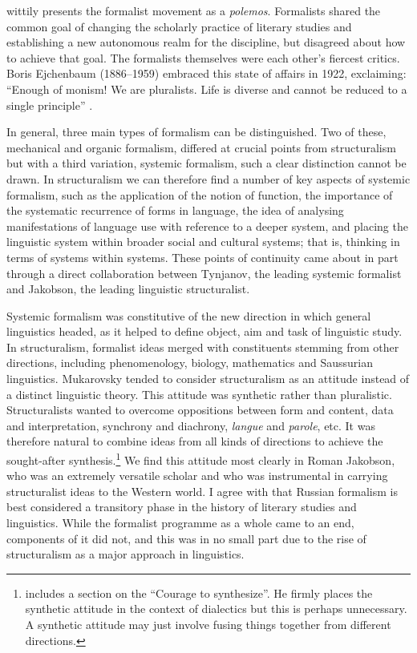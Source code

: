 \documentclass[output=paper]{langscibook}
\begin{document}
\citet{Steiner1984} wittily presents the formalist movement as a \emph{polemos}. Formalists shared the common goal of changing the scholarly practice of literary studies and establishing a new autonomous realm for the discipline, but disagreed about how to achieve that goal. The formalists themselves were each other's fiercest critics. Boris Ejchenbaum (1886--1959) embraced this state of affairs in 1922, exclaiming: ``Enough of monism! We are pluralists. Life is diverse and cannot be reduced to a single principle'' \citep[quoted in English in][259]{Steiner1984}.

In general, three main types of formalism can be distinguished. Two of these, mechanical and organic formalism, differed at crucial points from structuralism but with a third variation, systemic formalism, such a clear distinction cannot be drawn. In structuralism we can therefore find a number of key aspects of systemic formalism, such as the application of the notion of function, the importance of the systematic recurrence of forms in language, the idea of analysing manifestations of language use with reference to a deeper system, and placing the linguistic system within broader social and cultural systems; that is, thinking in terms of systems within systems. These points of continuity came about in part through a direct collaboration between Tynjanov, the leading systemic formalist and Jakobson, the leading linguistic structuralist.

Systemic formalism was constitutive of the new direction in which general linguistics headed, as it helped to define object, aim and task of linguistic study. In structuralism, formalist ideas merged with constituents stemming from other directions, including phenomenology, biology, mathematics and Saussurian linguistics. Mukarovsky tended to consider structuralism as an attitude instead of a distinct linguistic theory. This attitude was synthetic rather than pluralistic. Structuralists wanted to overcome oppositions between form and content, data and interpretation, synchrony and diachrony, \emph{langue} and \emph{parole}, etc. It was therefore natural to combine ideas from all kinds of directions to achieve the sought-after synthesis.\footnote{\citet[150--152]{Toman1995} includes a section on the ``Courage to synthesize''. He firmly places the synthetic attitude in the context of dialectics but this is perhaps unnecessary. A synthetic attitude may just involve fusing things together from different directions.} We find this attitude most clearly in Roman Jakobson, who was an extremely versatile scholar and who was instrumental in carrying structuralist ideas to the Western world. I agree with \citet{Steiner1984} that Russian formalism is best considered a transitory phase in the history of literary studies and linguistics. While the formalist programme as a whole came to an end, components of it did not, and this was in no small part due to the rise of structuralism as a major approach in linguistics. 
\end{document}
